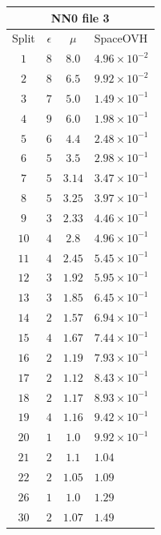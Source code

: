 \documentclass[11pt,a4paper,twoside,
openright]{book}
\begin{document}
		\begin{tabular}{| c | c | c | l |}
		
		\multicolumn{4}{c}{NN0 file 3} \\
		\hline
		Split & $\epsilon$ & $\mu$ & SpaceOVH \\ \hline
		
		\hline
		$1$ & $8$ & $8.0$ & $4.96\times 10^{-2}$ \\ 
		$2$ & $8$ & $6.5$ & $9.92\times 10^{-2}$ \\ 
		$3$ & $7$ & $5.0$ & $1.49\times 10^{-1}$ \\ 
		$4$ & $9$ & $6.0$ & $1.98\times 10^{-1}$ \\ 
		$5$ & $6$ & $4.4$ & $2.48\times 10^{-1}$ \\ 
		$6$ & $5$ & $3.5$ & $2.98\times 10^{-1}$ \\ 
		$7$ & $5$ & $3.14$ & $3.47\times 10^{-1}$ \\ 
		$8$ & $5$ & $3.25$ & $3.97\times 10^{-1}$ \\ 
		$9$ & $3$ & $2.33$ & $4.46\times 10^{-1}$ \\ 
		$10$ & $4$ & $2.8$ & $4.96\times 10^{-1}$ \\ 
		$11$ & $4$ & $2.45$ & $5.45\times 10^{-1}$ \\ 
		$12$ & $3$ & $1.92$ & $5.95\times 10^{-1}$ \\ 
		$13$ & $3$ & $1.85$ & $6.45\times 10^{-1}$ \\ 
		$14$ & $2$ & $1.57$ & $6.94\times 10^{-1}$ \\ 
		$15$ & $4$ & $1.67$ & $7.44\times 10^{-1}$ \\ 
		$16$ & $2$ & $1.19$ & $7.93\times 10^{-1}$ \\ 
		$17$ & $2$ & $1.12$ & $8.43\times 10^{-1}$ \\ 
		$18$ & $2$ & $1.17$ & $8.93\times 10^{-1}$ \\ 
		$19$ & $4$ & $1.16$ & $9.42\times 10^{-1}$ \\ 
		$20$ & $1$ & $1.0$ & $9.92\times 10^{-1}$ \\ 
		$21$ & $2$ & $1.1$ & $1.04$ \\ 
		$22$ & $2$ & $1.05$ & $1.09$ \\ 
		$26$ & $1$ & $1.0$ & $1.29$ \\ 
		$30$ & $2$ & $1.07$ & $1.49$ \\ 
		 
		
		\hline  
		
		\end{tabular}
	
\end{document}
